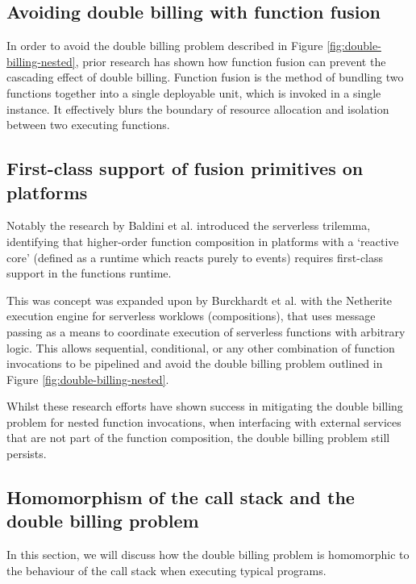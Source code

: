 \subsection{Avoiding double billing with function fusion}
\label{sec:function-fusion}
In order to avoid the double billing problem described in Figure \ref{fig:double-billing-nested}, prior research\cite{schirmerFusionizeImprovingServerless2022, elgamalCostlessOptimizingCost2018} has shown how function fusion can prevent the cascading effect of double billing. Function fusion is the method of bundling two functions together into a single deployable unit, which is invoked in a single instance. It effectively blurs the boundary of resource allocation and isolation between two executing functions.

\subsection{First-class support of fusion primitives on \faas{} platforms}
\label{sec:fusion-primitives}
Notably the research by Baldini et al. introduced the serverless trilemma\cite{baldiniServerlessTrilemmaFunction2017}, identifying that higher-order function composition in platforms with a `reactive core' (defined as a runtime which reacts purely to events) requires first-class support in the functions runtime.

This was concept was expanded upon by Burckhardt et al. with the Netherite\cite{burckhardtNetheriteEfficientExecution2022} execution engine for serverless worklows (compositions), that uses message passing as a means to coordinate execution of serverless functions with arbitrary logic. This allows sequential, conditional, or any other combination of function invocations to be pipelined and avoid the double billing problem outlined in Figure \ref{fig:double-billing-nested}.

Whilst these research efforts have shown success in mitigating the double billing problem for nested function invocations, when interfacing with external services that are not part of the function composition, the double billing problem still persists.

\subsection{Homomorphism of the call stack and the double billing problem}
In this section, we will discuss how the double billing problem is homomorphic to the behaviour of the call stack when executing typical programs.

